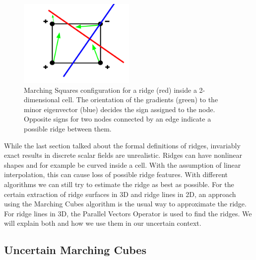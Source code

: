\begin{figure}[t]
  \centering
  \includegraphics[width=0.5\textwidth]{Images/MC.pdf}
  \caption{Marching Squares configuration for a ridge (red) inside a
  2-dimensional cell. The orientation of the gradients (green) to the
  minor eigenvector (blue) decides the sign assigned to the node.
  Opposite signs for two nodes connected by an edge indicate a
  possible ridge between them.}
  \label{fig:MC}
\end{figure}

While the last section talked about the formal definitions of ridges,
invariably exact results in discrete scalar fields are unrealistic.
Ridges can have nonlinear shapes and for example be curved inside a
cell. With the assumption of linear interpolation, this can cause loss
of possible ridge features. With different algorithms we can still try
to estimate the ridge as best as possible. For the certain extraction of
ridge surfaces in 3D and ridge lines in 2D, an approach using the
Marching Cubes algorithm is the usual way to approximate the ridge. For
ridge lines in 3D, the Parallel Vectors Operator is used to find the
ridges. We will explain both and how we use them in our uncertain
context.

\subsection{Uncertain Marching Cubes}

